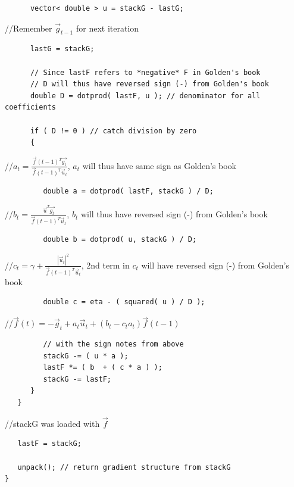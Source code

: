 \documentclass{report}[10pt]
\begin{document}
\begin{verbatim}
      vector< double > u = stackG - lastG;
\end{verbatim}
\hspace{24 pt}//\hspace{4 pt}Remember $\vec{g}_{t-1}$ for next iteration
\begin{verbatim}
      lastG = stackG;

      // Since lastF refers to *negative* F in Golden's book
      // D will thus have reversed sign (-) from Golden's book
      double D = dotprod( lastF, u ); // denominator for all coefficients

      if ( D != 0 ) // catch division by zero
      {
\end{verbatim}
\hspace{36 pt}//\hspace{4 pt}$a_t=\frac{\vec{f}(t-1)^T\vec{g_t}}{\vec{f}(t-1)^T\vec{u}_t}$,
$a_t$ will thus have same sign as Golden's book
\begin{verbatim}
         double a = dotprod( lastF, stackG ) / D;
\end{verbatim}
\hspace{36 pt}//\hspace{4 pt}$b_t=\frac{\vec{u}^T\vec{g_t}}{\vec{f}(t-1)^T\vec{u}_t}$,
$b_t$ will thus have reversed sign (-) from Golden's book
\begin{verbatim}
         double b = dotprod( u, stackG ) / D;
\end{verbatim}
\hspace{36 pt}//\hspace{4 pt}$c_t=\gamma+\frac{|\vec{u}_t|^2}{\vec{f}(t-1)^T\vec{u}_t}$,
2nd term in $c_t$ will have reversed sign (-) from Golden's book
\begin{verbatim}
         double c = eta - ( squared( u ) / D );

\end{verbatim}
\hspace{36 pt}//\hspace{4 pt}$\vec{f}(t)=-\vec{g}_t+a_t\vec{u}_t+(b_t-c_ta_t)\vec{f}(t-1)$
\begin{verbatim}
         // with the sign notes from above
         stackG -= ( u * a );
         lastF *= ( b  + ( c * a ) );
         stackG -= lastF;
      }
   }

\end{verbatim}
\hspace{12 pt}//\hspace{4 pt}stackG was loaded with $\vec{f}$
\begin{verbatim}
   lastF = stackG;

   unpack(); // return gradient structure from stackG
}
\end{verbatim}
\end{document}
